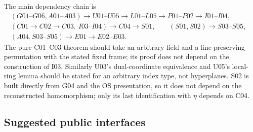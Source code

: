 \documentclass[11pt]{article}
\theoremstyle{remark}\newtheorem{remark}[theorem]{Remark}
\begin{document}
The main dependency chain is
\[
 \begin{gathered}
 (G01\text{--}G06,A01\text{--}A03)\longrightarrow
 U01\text{--}U05\longrightarrow L01\text{--}L05\longrightarrow
 P01\text{--}P02\longrightarrow I01\text{--}I04,\\
 (C01\longrightarrow C02\longrightarrow C03,\ I03\text{--}I04)
 \longrightarrow C04\longrightarrow S01,
 \qquad (S01,S02)\longrightarrow S03\text{--}S05,\\
 (A04,S03\text{--}S05)\longrightarrow E01\longrightarrow E02\text{--}E03.
 \end{gathered}
\]
The pure C01--C03 theorem should take an arbitrary field and a
line-preserving permutation with the stated fixed frame; its
proof does not depend on the construction of I03. Similarly
U03's dual-coordinate equivalence and U05's local-ring lemma
should be stated for an arbitrary index type, not hyperplanes.
S02 is built directly from G04 and the OS presentation, so it
does not depend on the reconstructed homomorphism; only its
last identification with $\eta$ depends on C04.

\subsection{Suggested public interfaces}
\end{document}
